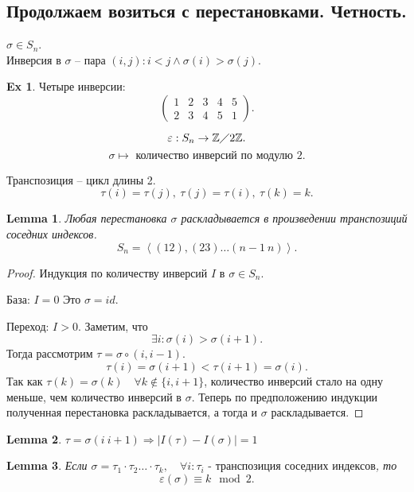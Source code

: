 \documentclass[11pt]{book}
\newcommand{\Z}{\mathbb{Z}}
\theoremstyle{definition}
\theoremstyle{plain}
\theoremstyle{plain}
\newtheorem*{lm}{Lemma}
\theoremstyle{definition}
\newtheorem*{ex}{Ex}
\theoremstyle{remark}
\begin{document}
\subsection{Продолжаем возиться с перестановками. Четность.}
\begin{defn}[Инверсия]
    $\sigma \in  S_n  $. \\
    Инверсия в $\sigma $ -- пара $(i, j): i < j \wedge \sigma  (i) > \sigma (j)$.
\end{defn}
\begin{ex}
    Четыре инверсии:
    \[
	\left ( 
	\begin{array}{ccccc}
	    1 &2&3&4&5\\
	    2 &3&4&5&1
	\end{array}
	\right )
    .\] 
\end{ex}
\begin{defn}
    \[
    \varepsilon : S_n \to \Z \diagup 2\Z
    .\] 
    \[
    \sigma  \mapsto \mbox{ количество инверсий по модулю 2}
    .\] 
\end{defn}
\begin{defn}
    Транспозиция -- цикл длины 2.
    \[
	\tau(i)= \tau(j), ~\tau(j) = \tau(i), ~ \tau(k)=k
    .\] 
\end{defn}
\begin{lm}
    Любая перестановка $\sigma $ раскладывается в произведении транспозиций соседних индексов.
    \[
	S_n = \left \langle (12), (23) \ldots (n-1~n) \right \rangle
    .\] 
\end{lm}
\begin{proof}
    Индукция по количеству инверсий $I$ в $\sigma \in  S_n$.

    База: $I = 0$ Это $\sigma  = id$.

    Переход: $I>0$. Заметим, что \[
	\exists i: \sigma (i) > \sigma (i+1)
    .\] 
    Тогда рассмотрим $\tau = \sigma \circ (i, i-1)$.
    \[
	\tau(i) = \sigma (i+1) < \tau(i+1) = \sigma  (i)
    .\] 
    Так как $\tau(k) = \sigma (k) \quad \forall k \notin \{i, i+1\}$, количество инверсий стало на одну меньше, чем количество инверсий в $\sigma $.
    Теперь по предположению индукции полученная перестановка раскладывается, а тогда и $\sigma $ раскладывается.
\end{proof}
\begin{lm}
    $\tau = \sigma (i ~ i+1) \Rightarrow |I(\tau) - I(\sigma )| =1$
\end{lm}
\begin{lm}
    Если $\sigma  = \tau_1\cdot \tau_2 \ldots\cdot \tau_k, \quad \forall i: \tau_i \mbox{ - транспозиция соседних индексов}$, то \[
	\varepsilon (\sigma ) \equiv k \mod 2
    .\] 
\end{lm}
\end{document}
